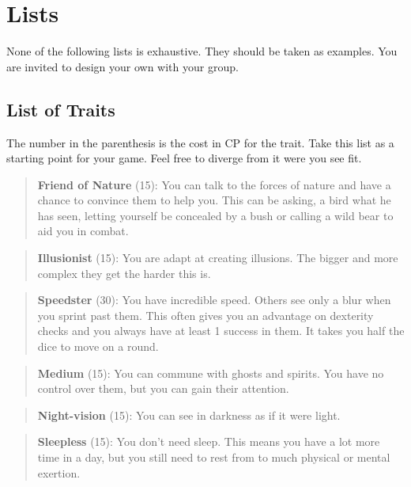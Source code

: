 \documentclass[11pt]{article}
\begin{document}
{\section{Lists}
\label{sec:org940bdc2}
None of the following lists is exhaustive. They should be taken as examples. You are invited to design your own with your group.

\subsection{List of Traits}
\label{sec:org8237ddc}
The number in the parenthesis is the cost in CP for the trait. Take this list as a starting point for your game. Feel free to diverge from it were you see fit.

\begin{quote}
\textbf{Friend of Nature} (15): You can talk to the forces of nature and have a chance to convince them to help you. This can be asking, a bird what he has seen, letting yourself be concealed by a bush or calling a wild bear to aid you in combat.
\end{quote}

\begin{quote}
\textbf{Illusionist} (15): You are adapt at creating illusions. The bigger and more complex they get the harder this is.
\end{quote}

\begin{quote}
\textbf{Speedster} (30): You have incredible speed. Others see only a blur when you sprint past them. This often gives you an advantage on dexterity checks and you always have at least 1 success in them. It takes you half the dice to move on a round.
\end{quote}

\begin{quote}
\textbf{Medium} (15): You can commune with ghosts and spirits. You have no control over them, but you can gain their attention.
\end{quote}

\begin{quote}
\textbf{Night-vision} (15): You can see in darkness as if it were light.
\end{quote}

\begin{quote}
\textbf{Sleepless} (15): You don't need sleep. This means you have a lot more time in a day, but you still need to rest from to much physical or mental exertion.
\end{quote}

}
\end{document}
